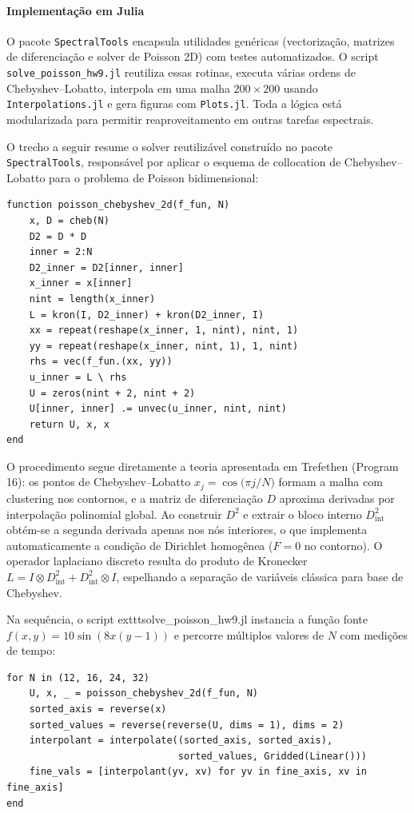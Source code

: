\documentclass[12pt,a4paper]{article}
\begin{document}
\paragraph{Implementação em Julia} O pacote \texttt{SpectralTools} encapsula utilidades genéricas (vectorização, matrizes de diferenciação e solver de Poisson 2D) com testes automatizados. O script \texttt{solve\_poisson\_hw9.jl} reutiliza essas rotinas, executa várias ordens de Chebyshev--Lobatto, interpola em uma malha $200\times200$ usando \texttt{Interpolations.jl} e gera figuras com \texttt{Plots.jl}. Toda a lógica está modularizada para permitir reaproveitamento em outras tarefas espectrais.

O trecho a seguir resume o solver reutilizável construído no pacote \texttt{SpectralTools}, responsável por aplicar o esquema de collocation de Chebyshev--Lobatto para o problema de Poisson bidimensional:

\begin{verbatim}
function poisson_chebyshev_2d(f_fun, N)
    x, D = cheb(N)
    D2 = D * D
    inner = 2:N
    D2_inner = D2[inner, inner]
    x_inner = x[inner]
    nint = length(x_inner)
    L = kron(I, D2_inner) + kron(D2_inner, I)
    xx = repeat(reshape(x_inner, 1, nint), nint, 1)
    yy = repeat(reshape(x_inner, nint, 1), 1, nint)
    rhs = vec(f_fun.(xx, yy))
    u_inner = L \ rhs
    U = zeros(nint + 2, nint + 2)
    U[inner, inner] .= unvec(u_inner, nint, nint)
    return U, x, x
end
\end{verbatim}

O procedimento segue diretamente a teoria apresentada em Trefethen (Program 16): os pontos de Chebyshev--Lobatto $x_j = \cos\big(\pi j/N\big)$ formam a malha com clustering nos contornos, e a matriz de diferenciação $D$ aproxima derivadas por interpolação polinomial global. Ao construir $D^2$ e extrair o bloco interno $D_{\text{int}}^2$ obtém-se a segunda derivada apenas nos nós interiores, o que implementa automaticamente a condição de Dirichlet homogênea ($F=0$ no contorno). O operador laplaciano discreto resulta do produto de Kronecker $L = I \otimes D_{\text{int}}^2 + D_{\text{int}}^2 \otimes I$, espelhando a separação de variáveis clássica para base de Chebyshev.

Na sequência, o script 	exttt{solve\_poisson\_hw9.jl} instancia a função fonte $f(x,y) = 10\sin(8x(y-1))$ e percorre múltiplos valores de $N$ com medições de tempo:

\begin{verbatim}
for N in (12, 16, 24, 32)
    U, x, _ = poisson_chebyshev_2d(f_fun, N)
    sorted_axis = reverse(x)
    sorted_values = reverse(reverse(U, dims = 1), dims = 2)
    interpolant = interpolate((sorted_axis, sorted_axis),
                              sorted_values, Gridded(Linear()))
    fine_vals = [interpolant(yv, xv) for yv in fine_axis, xv in fine_axis]
end
\end{verbatim}
\end{document}
